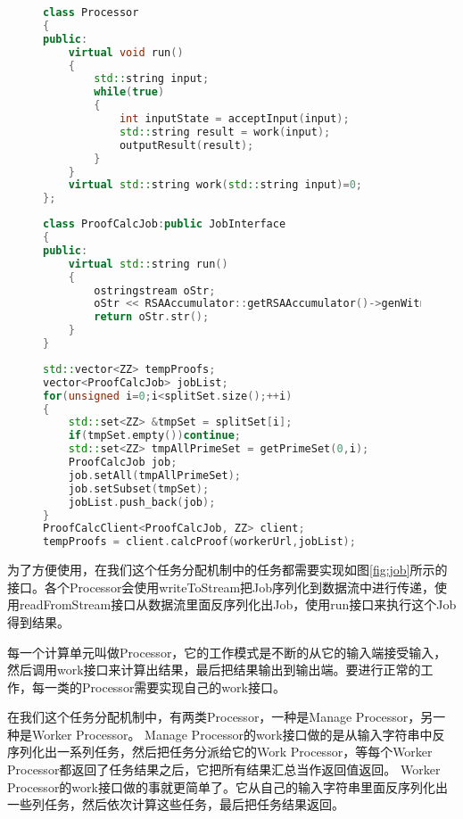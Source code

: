 \begin{figure}[htb]
\begin{lstlisting}[language=C++] 
class Processor
{
public:
    virtual void run()
    {
        std::string input;
        while(true)
        {
            int inputState = acceptInput(input);
            std::string result = work(input);
            outputResult(result);
        }
    }
    virtual std::string work(std::string input)=0;
};
\end{lstlisting}
\end{figure}
\begin{figure}[htb]
\begin{lstlisting}[language=C++] 
class ProofCalcJob:public JobInterface
{
public:
    virtual std::string run()
    {
        ostringstream oStr;
        oStr << RSAAccumulator::getRSAAccumulator()->genWitness(allSet, subset);
        return oStr.str();
    }
}
\end{lstlisting}
\end{figure}

\begin{figure}[htb]
\begin{lstlisting}[language=C++] 
std::vector<ZZ> tempProofs;
vector<ProofCalcJob> jobList;
for(unsigned i=0;i<splitSet.size();++i)
{
    std::set<ZZ> &tmpSet = splitSet[i];
    if(tmpSet.empty())continue;
    std::set<ZZ> tmpAllPrimeSet = getPrimeSet(0,i);
    ProofCalcJob job;
    job.setAll(tmpAllPrimeSet);
    job.setSubset(tmpSet);
    jobList.push_back(job);
}
ProofCalcClient<ProofCalcJob, ZZ> client;
tempProofs = client.calcProof(workerUrl,jobList);
\end{lstlisting}
\end{figure}

为了方便使用，在我们这个任务分配机制中的任务都需要实现如图\ref{fig:job}所示的接口。各个Processor会使用writeToStream把Job序列化到数据流中进行传递，使用readFromStream接口从数据流里面反序列化出Job，使用run接口来执行这个Job得到结果。

每一个计算单元叫做Processor，它的工作模式是不断的从它的输入端接受输入，然后调用work接口来计算出结果，最后把结果输出到输出端。要进行正常的工作，每一类的Processor需要实现自己的work接口。

在我们这个任务分配机制中，有两类Processor，一种是Manage Processor，另一种是Worker Processor。
Manage Processor的work接口做的是从输入字符串中反序列化出一系列任务，然后把任务分派给它的Work Processor，等每个Worker Processor都返回了任务结果之后，它把所有结果汇总当作返回值返回。
Worker Processor的work接口做的事就更简单了。它从自己的输入字符串里面反序列化出一些列任务，然后依次计算这些任务，最后把任务结果返回。

